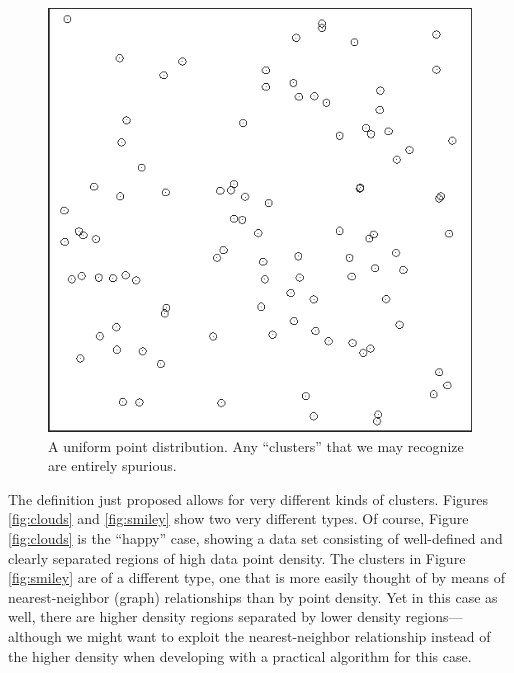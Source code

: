 \begin{figure}
  \centerline{\includegraphics{img/uniform}}
  \caption{A uniform point distribution. Any ``clusters'' that we
    may recognize are entirely spurious.}
  \label{fig:uniform}\vspace*{-6pt}
\end{figure}

The definition just proposed allows for very different kinds of
clusters.  Figures \ref{fig:clouds} and \ref{fig:smiley} show two very
different types. Of course, Figure \ref{fig:clouds} is the ``happy''
case, showing a data set consisting of well-defined and clearly
separated regions of high data point density.  The clusters in Figure
\ref{fig:smiley} are of a different type, one that is more easily
thought of by means of nearest-neighbor (graph) relationships than by
point density.  Yet in this case as well, there are higher density
regions separated by lower density regions---although we might want to
exploit the nearest-neighbor relationship instead of the higher
density when developing with a practical algorithm for this case.

